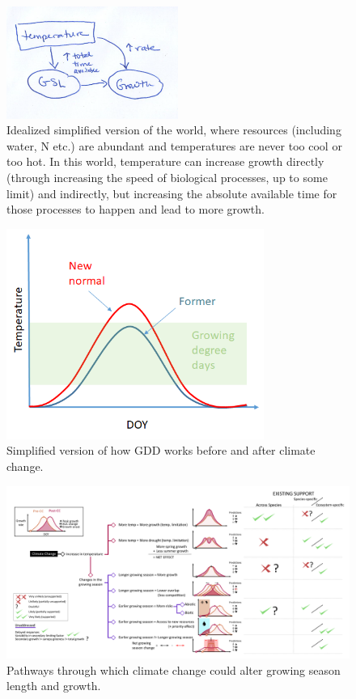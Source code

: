\documentclass[11pt]{article}
\begin{document}
\begin{figure}[h!]
\includegraphics[width=0.5\textwidth]{..//figures/gsltogrowth/gsltogrowth_emw1a.png}
\caption{Idealized simplified version of the world, where resources (including water, N etc.) are abundant and temperatures are never too cool or too hot. In this world, temperature can increase growth directly (through increasing the speed of biological processes, up to some limit) and indirectly, but increasing the absolute available time for those processes to happen and lead to more growth.}
\label{fig:concepbiotime}
\end{figure}


\begin{figure}[h!]
\includegraphics[width=0.75\textwidth]{..//figures/simpletempcurve_fromlucidboard.png}
\caption{Simplified version of how GDD works before and after climate change.}
\label{fig:simpletemp}
\end{figure}




\begin{figure}[h!]
\includegraphics[width=1\textwidth]{..//figures/some conceptual figure2.0.png}
\caption{Pathways through which climate change could alter growing season length and growth.}
\label{fig:pathways}
\end{figure}
\end{document}
